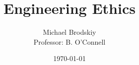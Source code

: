 


\title{Engineering Ethics}
\date{\today}
\author{Michael Brodskiy\\ \small Professor: B. O'Connell}



\maketitle

